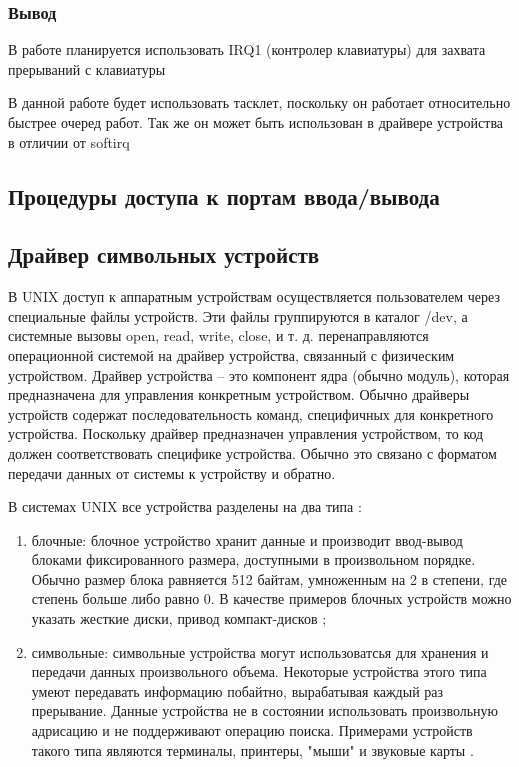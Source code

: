 \subsubsection{Вывод}
В работе планируется использовать IRQ1 (контролер клавиатуры) для захвата прерываний с клавиатуры

В данной работе будет использовать тасклет, поскольку он работает относительно быстрее очеред работ. 
Так же он может быть использован в драйвере устройства в отличии от softirq

\subsection{Процедуры доступа к портам ввода/вывода}


\subsection{Драйвер символьных устройств}
В UNIX доступ к аппаратным устройствам осуществляется пользователем через специальные файлы устройств. 
Эти файлы группируются в каталог /dev, а системные вызовы open, read, write, close, и т. д. перенаправляются операционной системой на драйвер устройства, связанный с физическим устройством.
Драйвер устройства – это компонент ядра (обычно модуль), которая предназначена для управления конкретным устройством. 
Обычно драйверы устройств содержат последовательность команд, специфичных для конкретного устройства. 
Поскольку драйвер предназначен управления устройством, то код должен соответствовать специфике устройства. 
Обычно это связано с форматом передачи данных от системы к устройству и обратно.

В системах UNIX все устройства разделены на два типа \cite{5}:
\begin{enumerate}
	\item блочные: блочное устройство хранит данные и производит ввод-вывод блоками фиксированного размера, доступными в произвольном порядке.
	Обычно размер блока равняется 512 байтам, умноженным на 2 в степени, где степень больше либо равно 0.
	В качестве примеров блочных устройств можно указать жесткие диски, привод компакт-дисков \cite{5};
	\item символьные: символьные устройства могут использоватсья для хранения и передачи данных произвольного объема. 
	Некоторые устройства этого типа умеют передавать информацию побайтно, вырабатывая каждый раз прерывание.
	Данные устройства не в состоянии использовать произвольную адрисацию и не поддерживают операцию поиска.
	Примерами устройств такого типа являются терминалы, принтеры, "мыши" и звуковые карты \cite{5}.
\end{enumerate}

